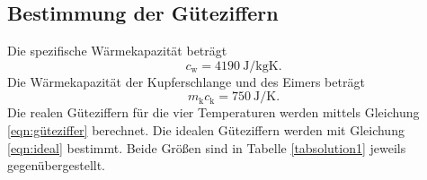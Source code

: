 \subsection{Bestimmung der Güteziffern}
Die spezifische Wärmekapazität beträgt
\begin{equation*}
    c_\text{w} = \SI{4190}{\joule\per\kilo\gram\kelvin}. %
\end{equation*}
Die Wärmekapazität der Kupferschlange und des Eimers beträgt
\begin{equation*}
    m_\text{k} c_\text{k} = \SI{750}{\joule\per\kelvin}.
\end{equation*}
Die realen Güteziffern für die vier Temperaturen werden mittels
Gleichung \eqref{eqn:güteziffer} berechnet. %
Die idealen Güteziffern werden mit Gleichung \eqref{eqn:ideal} %
bestimmt.
Beide Größen sind in Tabelle \ref{tabsolution1} jeweils
gegenübergestellt.


